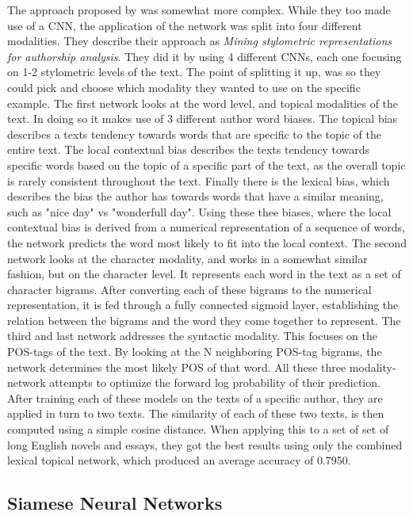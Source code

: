 The approach proposed by \cite{ding2016} was somewhat more complex. While they
too made use of a \gls{CNN}, the application of the network was split into four
different modalities. They describe their approach as \textit{Mining stylometric
representations for authorship analysis}. They did it by using 4 different
\gls{CNN}s, each one focusing on 1-2 stylometric levels of the text. The point
of splitting it up, was so they could pick and choose which modality they wanted
to use on the specific example. The first network looks at the word level,
and topical modalities of the text. In doing so it makes use of 3 different
author word biases. The topical bias describes a texts tendency towards words
that are specific to the topic of the entire text. The local contextual bias
describes the texts tendency towards specific words based on the topic of a
specific part of the text, as the overall topic is rarely consistent throughout
the text. Finally there is the lexical bias, which describes the bias the
author has towards words that have a similar meaning, such as "nice day" vs
"wonderfull day". Using these thee biases, where the local contextual bias is
derived from a numerical representation of a sequence of words, the network
predicts the word most likely to fit into the local context. The second network
looks at the character modality, and works in a somewhat similar fashion,
but on the character level. It represents each word in the text as a set of
character bigrams. After converting each of these bigrams to the numerical
representation, it is fed through a fully connected sigmoid layer, establishing
the relation between the bigrams and the word they come together to represent.
The third and last network addresses the syntactic modality. This focuses on
the \gls{POS}-tags of the text. By looking at the N neighboring \gls{POS}-tag
bigrams, the network determines the most likely \gls{POS} of that word. All
these three modality-network attempts to optimize the forward log probability of
their prediction. After training each of these models on the texts of a specific
author, they are applied in turn to two texts. The similarity of each of these
two texts, is then computed using a simple cosine distance. When applying this
to a set of set of long English novels and essays, they got the best results
using only the combined lexical topical network, which produced an average
accuracy of 0.7950.


\subsection{Siamese Neural Networks}

